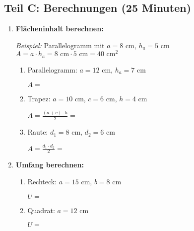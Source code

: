 \subsection*{Teil C: Berechnungen (25 Minuten)}

\begin{enumerate}[label=\arabic*.,resume]

    \item \textbf{Flächeninhalt berechnen:}

    \textit{Beispiel:} Parallelogramm mit $a = 8$ cm, $h_a = 5$ cm
    $A = a \cdot h_a = 8 \text{ cm} \cdot 5 \text{ cm} = 40 \text{ cm}^2$

    \vspace{0.5cm}

    \begin{enumerate}[label=\alph*)]
        \item Parallelogramm: $a = 12$ cm, $h_a = 7$ cm

        $A = $ \underline{\hspace{8cm}}

        \vspace{1cm}

        \item Trapez: $a = 10$ cm, $c = 6$ cm, $h = 4$ cm

        $A = \frac{(a+c) \cdot h}{2} = $ \underline{\hspace{8cm}}

        \vspace{1cm}

        \item Raute: $d_1 = 8$ cm, $d_2 = 6$ cm

        $A = \frac{d_1 \cdot d_2}{2} = $ \underline{\hspace{8cm}}

    \end{enumerate}

    \vspace{1cm}

    \item \textbf{Umfang berechnen:}

    \begin{enumerate}[label=\alph*)]
        \item Rechteck: $a = 15$ cm, $b = 8$ cm

        $U = $ \underline{\hspace{8cm}}

        \vspace{1cm}

        \item Quadrat: $a = 12$ cm

        $U = $ \underline{\hspace{8cm}}

    \end{enumerate}

\end{enumerate}